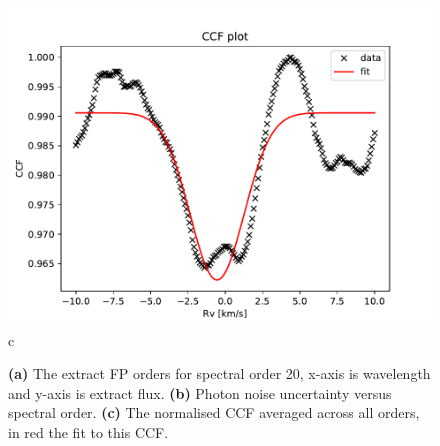 \begin{figure}
\begin{center}
\begin{minipage}{.495\textwidth}
\begin{center}
\includegraphics[width=\textwidth]{Figures/cal_ccf_e2ds_3.pdf}
c
\end{center}
\end{minipage}%
\end{center}

\caption{\textbf{(a)} The extract FP orders for spectral order 20, x-axis is wavelength and y-axis is extract flux. \textbf{(b)} Photon noise uncertainty versus spectral order. \textbf{(c)} The normalised CCF averaged across all orders, in red the fit to this CCF. \label{figure:cal_ccf_spirou}}
\end{figure}